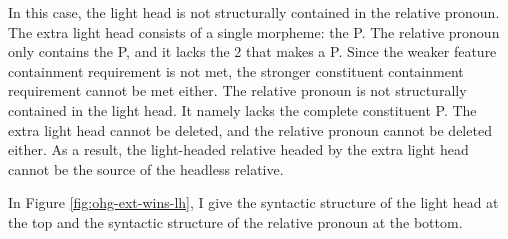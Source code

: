In this case, the light head is not structurally contained in the relative pronoun.
The extra light head consists of a single morpheme: the P.
The relative pronoun only contains the P, and it lacks the 2 that makes a P. Since the weaker feature containment requirement is not met, the stronger constituent containment requirement cannot be met either.
The relative pronoun is not structurally contained in the light head. It namely lacks the complete constituent P.
The extra light head cannot be deleted, and the relative pronoun cannot be deleted either.
As a result, the light-headed relative headed by the extra light head cannot be the source of the headless relative.

In Figure \ref{fig:ohg-ext-wins-lh}, I give the syntactic structure of the light head at the top and the syntactic structure of the relative pronoun at the bottom.

